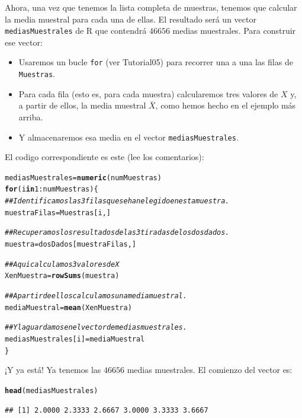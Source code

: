 \documentclass[10pt,a4paper]{article}\usepackage[]{graphicx}\usepackage[]{color}
\makeatletter
\newcommand{\hlnum}[1]{\textcolor[rgb]{0.686,0.059,0.569}{#1}}%
\newcommand{\hlcom}[1]{\textcolor[rgb]{0.678,0.584,0.686}{\textit{#1}}}%
\newcommand{\hlopt}[1]{\textcolor[rgb]{0,0,0}{#1}}%
\newcommand{\hlstd}[1]{\textcolor[rgb]{0.345,0.345,0.345}{#1}}%
\newcommand{\hlkwa}[1]{\textcolor[rgb]{0.161,0.373,0.58}{\textbf{#1}}}%
\newcommand{\hlkwb}[1]{\textcolor[rgb]{0.69,0.353,0.396}{#1}}%
\newcommand{\hlkwd}[1]{\textcolor[rgb]{0.737,0.353,0.396}{\textbf{#1}}}%
\newenvironment{kframe}{%
 \def\at@end@of@kframe{}%
 \ifinner\ifhmode%
  \def\at@end@of@kframe{\end{minipage}}%
  \begin{minipage}{\columnwidth}%
 \fi\fi%
 \def\FrameCommand##1{\hskip\@totalleftmargin \hskip-\fboxsep
 \colorbox{shadecolor}{##1}\hskip-\fboxsep
     \hskip-\linewidth \hskip-\@totalleftmargin \hskip\columnwidth}%
 \MakeFramed {\advance\hsize-\width
   \@totalleftmargin\z@ \linewidth\hsize
   \@setminipage}}%
 {\par\unskip\endMakeFramed%
 \at@end@of@kframe}
\newenvironment{knitrout}{}{} %
\newcounter {cont01}
\makeatother
\begin{document}
Ahora, una vez que tenemos la lista completa de muestras, tenemos que calcular la media muestral para cada una de ellas. El resultado será un vector {\tt mediasMuestrales} de R que contendrá $46656$ medias muestrales. Para construir ese vector:
\begin{itemize}
  \item Usaremos un bucle {\tt for} (ver Tutorial05) para recorrer una a una las filas de {\tt Muestras}.
  \item Para cada fila (esto es, para cada muestra) calcularemos tres valores de $X$ y, a partir de ellos, la media muestral $\bar X$, como hemos hecho en el ejemplo más arriba.
  \item Y almacenaremos esa media en el vector {\tt mediasMuestrales}.
\end{itemize}
El codigo correspondiente es este (lee los comentarios):
\begin{knitrout}
\color{fgcolor}\begin{kframe}
\begin{alltt}
\hlstd{mediasMuestrales} \hlkwb{=} \hlkwd{numeric}\hlstd{(numMuestras)}
\hlkwa{for}\hlstd{(i} \hlkwa{in} \hlnum{1}\hlopt{:}\hlstd{numMuestras)\{}
    \hlcom{## Identificamos las 3 filas que se han elegido en esta muestra.}
    \hlstd{muestraFilas} \hlkwb{=} \hlstd{Muestras[i, ]}

    \hlcom{## Recuperamos los resultados de las 3 tiradas de los dos dados.}
    \hlstd{muestra} \hlkwb{=} \hlstd{dosDados[muestraFilas, ]}

    \hlcom{## Aqui calculamos 3 valores de X}
    \hlstd{XenMuestra} \hlkwb{=} \hlkwd{rowSums}\hlstd{(muestra)}

    \hlcom{## A partir de ellos calculamos una media muestral.}
    \hlstd{mediaMuestral} \hlkwb{=} \hlkwd{mean}\hlstd{(XenMuestra)}

    \hlcom{## Y la guardamos en el vector de medias muestrales.}
    \hlstd{mediasMuestrales[i]} \hlkwb{=} \hlstd{mediaMuestral}
\hlstd{\}}
\end{alltt}
\end{kframe}
\end{knitrout}
¡Y ya está! Ya tenemos las $46656$ medias muestrales. El comienzo del vector es:
\begin{knitrout}
\color{fgcolor}\begin{kframe}
\begin{alltt}
\hlkwd{head}\hlstd{(mediasMuestrales)}
\end{alltt}
\begin{verbatim}
## [1] 2.0000 2.3333 2.6667 3.0000 3.3333 3.6667
\end{verbatim}
\end{kframe}
\end{knitrout}
\end{document}
